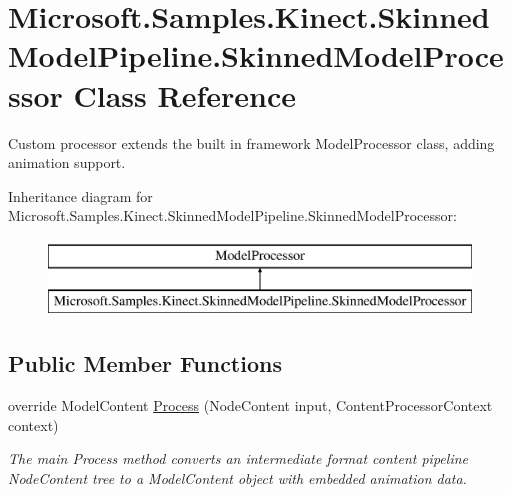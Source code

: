 \hypertarget{class_microsoft_1_1_samples_1_1_kinect_1_1_skinned_model_pipeline_1_1_skinned_model_processor}{\section{Microsoft.\+Samples.\+Kinect.\+Skinned\+Model\+Pipeline.\+Skinned\+Model\+Processor Class Reference}
\label{class_microsoft_1_1_samples_1_1_kinect_1_1_skinned_model_pipeline_1_1_skinned_model_processor}
}


Custom processor extends the built in framework Model\+Processor class, adding animation support.  


Inheritance diagram for Microsoft.\+Samples.\+Kinect.\+Skinned\+Model\+Pipeline.\+Skinned\+Model\+Processor\+:\begin{figure}[H]
\begin{center}
\leavevmode
\includegraphics[height=2.000000cm]{class_microsoft_1_1_samples_1_1_kinect_1_1_skinned_model_pipeline_1_1_skinned_model_processor}
\end{center}
\end{figure}
\subsection*{Public Member Functions}
\begin{DoxyCompactItemize}
\item 
override Model\+Content \hyperlink{class_microsoft_1_1_samples_1_1_kinect_1_1_skinned_model_pipeline_1_1_skinned_model_processor_aeb3f8db38e99e916f3cf052e1e588757}{Process} (Node\+Content input, Content\+Processor\+Context context)
\begin{DoxyCompactList}\small\item\em The main Process method converts an intermediate format content pipeline Node\+Content tree to a Model\+Content object with embedded animation data. \end{DoxyCompactList}\end{DoxyCompactItemize}

